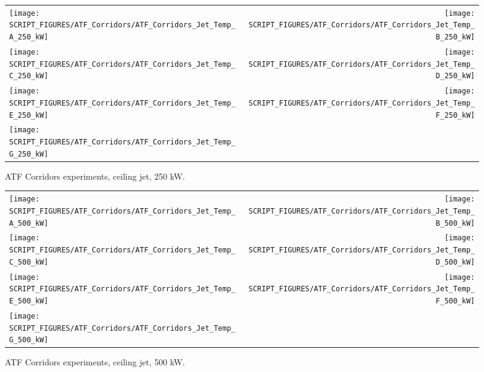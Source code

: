 \begin{figure}[p]
\begin{tabular*}{\textwidth}{l@{\extracolsep{\fill}}r}
\texttt{[image: SCRIPT\_FIGURES/ATF\_Corridors/ATF\_Corridors\_Jet\_Temp\_A\_250\_kW]} &
\texttt{[image: SCRIPT\_FIGURES/ATF\_Corridors/ATF\_Corridors\_Jet\_Temp\_B\_250\_kW]} \\
\texttt{[image: SCRIPT\_FIGURES/ATF\_Corridors/ATF\_Corridors\_Jet\_Temp\_C\_250\_kW]} &
\texttt{[image: SCRIPT\_FIGURES/ATF\_Corridors/ATF\_Corridors\_Jet\_Temp\_D\_250\_kW]} \\
\texttt{[image: SCRIPT\_FIGURES/ATF\_Corridors/ATF\_Corridors\_Jet\_Temp\_E\_250\_kW]} &
\texttt{[image: SCRIPT\_FIGURES/ATF\_Corridors/ATF\_Corridors\_Jet\_Temp\_F\_250\_kW]} \\
\texttt{[image: SCRIPT\_FIGURES/ATF\_Corridors/ATF\_Corridors\_Jet\_Temp\_G\_250\_kW]} &
\end{tabular*}
\caption[ATF Corridors experiments, ceiling jet, 250 kW]
{ATF Corridors experiments, ceiling jet, 250 kW.}
\label{ATF_Corridors_Jet_Temp_250_kW}
\end{figure}

\begin{figure}[p]
\begin{tabular*}{\textwidth}{l@{\extracolsep{\fill}}r}
\texttt{[image: SCRIPT\_FIGURES/ATF\_Corridors/ATF\_Corridors\_Jet\_Temp\_A\_500\_kW]} &
\texttt{[image: SCRIPT\_FIGURES/ATF\_Corridors/ATF\_Corridors\_Jet\_Temp\_B\_500\_kW]} \\
\texttt{[image: SCRIPT\_FIGURES/ATF\_Corridors/ATF\_Corridors\_Jet\_Temp\_C\_500\_kW]} &
\texttt{[image: SCRIPT\_FIGURES/ATF\_Corridors/ATF\_Corridors\_Jet\_Temp\_D\_500\_kW]} \\
\texttt{[image: SCRIPT\_FIGURES/ATF\_Corridors/ATF\_Corridors\_Jet\_Temp\_E\_500\_kW]} &
\texttt{[image: SCRIPT\_FIGURES/ATF\_Corridors/ATF\_Corridors\_Jet\_Temp\_F\_500\_kW]} \\
\texttt{[image: SCRIPT\_FIGURES/ATF\_Corridors/ATF\_Corridors\_Jet\_Temp\_G\_500\_kW]} &
\end{tabular*}
\caption[ATF Corridors experiments, ceiling jet, 500 kW]
{ATF Corridors experiments, ceiling jet, 500 kW.}
\label{ATF_Corridors_Jet_Temp_500_kW}
\end{figure}

